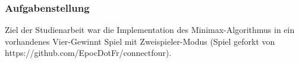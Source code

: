 \begin{frame}
\frametitle{Aufgabenstellung}
Ziel der Studienarbeit war die Implementation des Minimax-Algorithmus in ein vorhandenes Vier-Gewinnt Spiel mit Zweispieler-Modus (Spiel geforkt von https://github.com/EpocDotFr/connectfour).
\end{frame}
